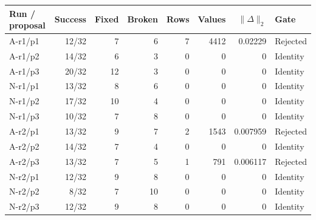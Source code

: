 \begin{tabularx}{\linewidth}{@{}lrrrrrrX@{}}
\toprule
Run / proposal & Success & Fixed & Broken & Rows & Values & $\|\Delta\|_2$ & Gate \\
\midrule
A-r1/p1 & 12/32 & 7 & 6 & 7 & 4412 & 0.02229 & Rejected \\
A-r1/p2 & 14/32 & 6 & 3 & 0 & 0 & 0 & Identity \\
A-r1/p3 & 20/32 & 12 & 3 & 0 & 0 & 0 & Identity \\
N-r1/p1 & 13/32 & 8 & 6 & 0 & 0 & 0 & Identity \\
N-r1/p2 & 17/32 & 10 & 4 & 0 & 0 & 0 & Identity \\
N-r1/p3 & 10/32 & 7 & 8 & 0 & 0 & 0 & Identity \\
A-r2/p1 & 13/32 & 9 & 7 & 2 & 1543 & 0.007959 & Rejected \\
A-r2/p2 & 14/32 & 7 & 4 & 0 & 0 & 0 & Identity \\
A-r2/p3 & 13/32 & 7 & 5 & 1 & 791 & 0.006117 & Rejected \\
N-r2/p1 & 12/32 & 9 & 8 & 0 & 0 & 0 & Identity \\
N-r2/p2 & 8/32 & 7 & 10 & 0 & 0 & 0 & Identity \\
N-r2/p3 & 12/32 & 9 & 8 & 0 & 0 & 0 & Identity \\
\bottomrule
\end{tabularx}
